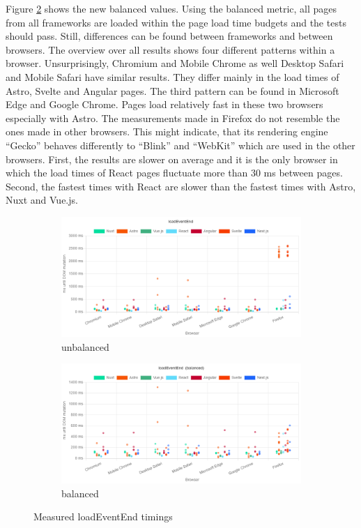 \documentclass[a4paper, 12pt]{article}
\begin{document}
Figure \ref{subfig:Playwright:loadEventEnd:balanced} shows the new balanced values.
Using the balanced metric, all pages from all frameworks are loaded within the page load time budgets and the tests should pass.
Still, differences can be found between frameworks and between browsers.
The overview over all results shows four different patterns within a browser.
Unsurprisingly, Chromium and Mobile Chrome as well Desktop Safari and Mobile Safari have similar results.
They differ mainly in the load times of Astro, Svelte and Angular pages.
The third pattern can be found in Microsoft Edge and Google Chrome.
Pages load relatively fast in these two browsers especially with Astro.
The measurements made in Firefox do not resemble the ones made in other browsers.
This might indicate, that its rendering engine \enquote{Gecko} behaves differently to \enquote{Blink} and \enquote{WebKit} which are used in the other browsers.
First, the results are slower on average and it is the only browser in which the load times of React pages fluctuate more than 30 ms between pages.
Second, the fastest times with React are slower than the fastest times with Astro, Nuxt and Vue.js.

\begin{figure}
  \centering
  \begin{subfigure}{\linewidth}
    \includegraphics[width=\linewidth, keepaspectratio]{img/playwright-results/loadEventEnd/total.png}
    \caption{unbalanced}\label{subfig:Playwright:loadEventEnd:unbalanced}
  \end{subfigure}
  \begin{subfigure}{\linewidth}
    \includegraphics[width=\linewidth, keepaspectratio]{img/playwright-results/loadEventEnd_balanced/total.png}
    \caption{balanced}\label{subfig:Playwright:loadEventEnd:balanced}
  \end{subfigure}
  \caption{Measured loadEventEnd timings}
  \label{fig:Playwright:loadEventEnd}
\end{figure}
\end{document}
